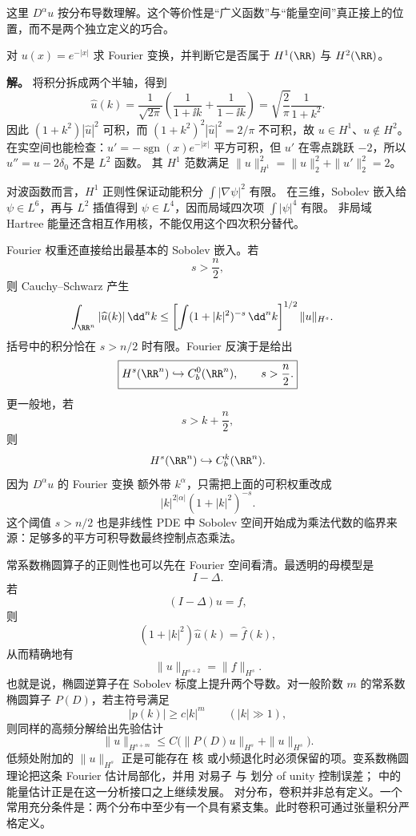 这里 $D^\alpha u$ 按分布导数理解。这个等价性是“广义函数”与“能量空间”真正接上的位置，而不是两个独立定义的巧合。

\begin{workedexample}[尖点函数属于哪一阶能量空间]
对 $u(x)=e^{-|x|}$ 求 Fourier 变换，并判断它是否属于 $H^1(\RR)$ 与 $H^2(\RR)$。

\textbf{解。} 将积分拆成两个半轴，得到
\[
\widehat u(k)=\frac1{\sqrt{2\pi}}
\left(\frac1{1+\ii k}+\frac1{1-\ii k}\right)
=\sqrt{\frac2\pi}\frac1{1+k^2}.
\]
因此 $(1+k^2)|\widehat u|^2$ 可积，而 $(1+k^2)^2|\widehat u|^2=2/\pi$ 不可积，故 $u\in H^1$、$u\notin H^2$。
在实空间也能检查：$u'=-\operatorname{sgn}(x)e^{-|x|}$ 平方可积，但 $u'$ 在零点跳跃 $-2$，所以 $u''=u-2\delta_0$ 不是 $L^2$ 函数。
其 $H^1$ 范数满足 $\|u\|_{H^1}^2=\|u\|_2^2+\|u'\|_2^2=2$。
\end{workedexample}

对波函数而言，$H^1$ 正则性保证动能积分 $\int|\nabla\psi|^2$ 有限。
在三维，Sobolev 嵌入给 $\psi\in L^6$，再与 $L^2$ 插值得到 $\psi\in L^4$，因而局域四次项 $\int|\psi|^4$ 有限。
非局域 Hartree 能量还含相互作用核，不能仅用这个四次积分替代。

Fourier 权重还直接给出最基本的 Sobolev 嵌入。若
\[
s>\frac n2,
\]
则 Cauchy--Schwarz 产生
\begin{align*}
\int_{\RR^n}|\widehat u(k)|\,\dd^n k
&\le
\left[
\int(1+|k|^2)^{-s}\,\dd^n k
\right]^{1/2}
\|u\|_{H^s}.
\end{align*}
括号中的积分恰在 $s>n/2$ 时有限。Fourier 反演于是给出
\begin{equation*}\boxed{
H^s(\RR^n)\hookrightarrow C_b^0(\RR^n),
\qquad s>\frac n2.
}\end{equation*}
更一般地，若
\[
s>k+\frac n2,
\]
则
\begin{equation*}H^s(\RR^n)\hookrightarrow C_b^k(\RR^n).\end{equation*}
因为 $D^\alpha u$ 的 Fourier 变换 额外带 $k^\alpha$，只需把上面的可积权重改成
\[
|k|^{2|\alpha|}(1+|k|^2)^{-s}.
\]
这个阈值 $s>n/2$ 也是非线性 PDE 中 Sobolev 空间开始成为乘法代数的临界来源：足够多的平方可积导数最终控制点态乘法。

常系数椭圆算子的正则性也可以先在 Fourier 空间看清。最透明的母模型是
\[
I-\Delta.
\]
若
\begin{equation*}(I-\Delta)u=f,\end{equation*}
则
\[
(1+|k|^2)\widehat u(k)=\widehat f(k),
\]
从而精确地有
\begin{equation*}\boxed{
\|u\|_{H^{s+2}}
=\|f\|_{H^s}.
}\end{equation*}
也就是说，椭圆逆算子在 Sobolev 标度上提升两个导数。对一般阶数 $m$ 的常系数椭圆算子 $P(D)$，若主符号满足
\[
|p(k)|\ge c|k|^m
\qquad(|k|\gg1),
\]
则同样的高频分解给出先验估计
\begin{equation*}\|u\|_{H^{s+m}}
\le C\bigl(\|P(D)u\|_{H^s}+\|u\|_{H^s}\bigr).\end{equation*}
低频处附加的 $\|u\|_{H^s}$ 正是可能存在 核 或小频退化时必须保留的项。变系数椭圆理论把这条 Fourier 估计局部化，并用 对易子 与 划分 of unity 控制误差； 中的能量估计正是在这一分析接口之上继续发展。
对分布，卷积并非总有定义。一个常用充分条件是：两个分布中至少有一个具有紧支集。此时卷积可通过张量积分严格定义。


